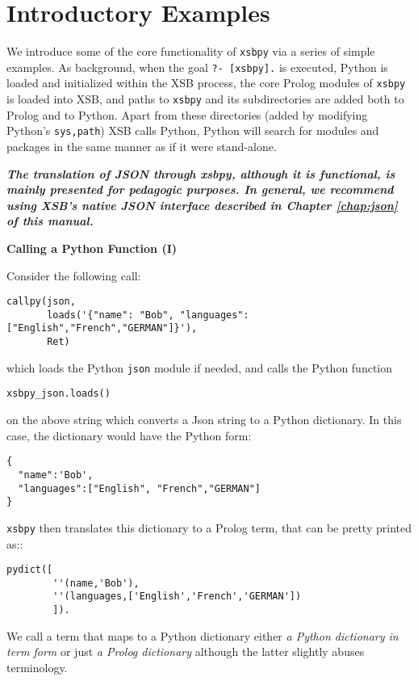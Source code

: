 \section{Introductory Examples}

We introduce some of the core functionality of {\tt xsbpy} via a
series of simple examples.  As background, when the goal {\tt ?-
  [xsbpy].} is executed, Python is loaded and initialized within the
XSB process, the core Prolog modules of {\tt xsbpy} is loaded into
XSB, and paths to {\tt xsbpy} and its subdirectories are added both to
Prolog and to Python.  Apart from these directories (added by
modifying Python's {\tt sys,path}) XSB calls Python, Python will
search for modules and packages in the same manner as if it were
stand-alone.

{\bf {\em The translation of JSON through xsbpy, although it is
    functional, is mainly presented for pedagogic purposes.  In
    general, we recommend using XSB's native JSON interface described
    in Chapter \ref{chap:json} of this manual.    }}

\begin{example} \rm {\bf Calling a Python Function (I)}
  
\noindent  
Consider the following call:

 \begin{verbatim}
callpy(json,
       loads('{"name": "Bob", "languages": ["English","French","GERMAN"]}'),
       Ret)
\end{verbatim}
 
\noindent 
which loads the Python {\tt json} module if needed, and calls the
Python function

{\tt xsbpy\_json.loads()}

\noindent
on the above string which converts a Json string to a Python
dictionary.  In this case, the dictionary would have the Python form:
\begin{verbatim}
{
  "name":'Bob',
  "languages":["English", "French","GERMAN"]
}
\end{verbatim}
{\tt xsbpy} then translates this dictionary to a Prolog term, that can
be pretty printed as::
\begin{verbatim}
pydict([
        ''(name,'Bob'),
        ''(languages,['English','French','GERMAN'])
        ]).
\end{verbatim}
We call a term that maps to a Python dictionary either {\em a Python
  dictionary in term form} or just {\em a Prolog dictionary} although
the latter slightly abuses terminology.
\end{example}

